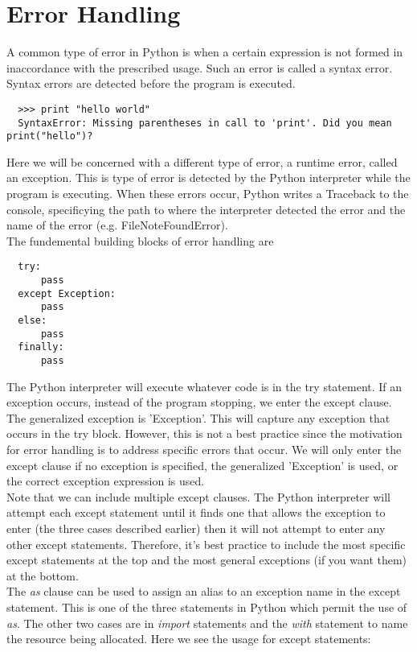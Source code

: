 \documentclass{article}%
\begin{document}
\section{Error Handling}
A common type of error in Python is when a certain expression is not formed in inaccordance with the prescribed usage. Such an error is called a syntax error. Syntax errors are detected before the program is executed. 
\begin{lstlisting}
  >>> print "hello world"
  SyntaxError: Missing parentheses in call to 'print'. Did you mean print("hello")?
\end{lstlisting}
Here we will be concerned with a different type of error, a runtime error, called an exception. This is type of error is detected by the Python interpreter while the program is executing. When these errors occur, Python writes a Traceback to the console, specificying the path to where the interpreter detected the error and the name of the error (e.g. FileNoteFoundError). \\ 

The fundemental building blocks of error handling are
\begin{lstlisting}
  try:
      pass
  except Exception:
      pass
  else:
      pass
  finally:
      pass
\end{lstlisting}
The Python interpreter will execute whatever code is in the try statement. If an exception occurs, instead of the program stopping, we enter the except clause.
The generalized exception is 'Exception'. This will capture any exception that occurs in the try block. However, this is not a best practice since the motivation 
for error handling is to address specific errors that occur. We will only enter the except clause if no exception is specified, the generalized 'Exception' is used, or the correct exception expression is used. \\

Note that we can include multiple except clauses. The Python interpreter will attempt each except statement until it finds one that allows the exception to enter (the three cases described earlier) then it will not attempt to enter any
other except statements. Therefore, it's best practice to include the most specific except statements at the top and the most general exceptions (if you want them) at the bottom. \\

The \textit{as} clause can be used to assign an alias to an exception name in the except statement. This is one of the three statements in Python which permit the use of \textit{as}.
The other two cases are in \textit{import} statements and the \textit{with} statement to name the resource being allocated. Here we see the usage for except statements:
\end{document}
